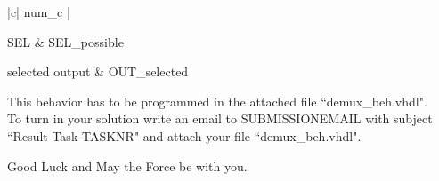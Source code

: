 \documentclass[a4paper,12pt]{article}
\newcommand\Tstrut{\rule{0pt}{2.6ex}}       %
\begin{document}
\begin{table}[h!]
\centering
    \begin{tabular}{|c| {{num_c}} |} \hline \Tstrut
		SEL & {{SEL_possible}}  \\ \hline \Tstrut
		selected output & {{OUT_selected}} \\
		\hline
    \end{tabular}
    \caption{Selected output depending on SEL}
    \label{tab:SELoutput}  
\end{table}

This behavior has to be programmed in the attached file ``demux\_beh.vhdl".\\

To turn in your solution write an email to {{SUBMISSIONEMAIL}} with subject ``Result Task {{TASKNR}}" and attach your file ``demux\_beh.vhdl".

\vspace{0.7cm}
Good Luck and May the Force be with you.
\end{document}
